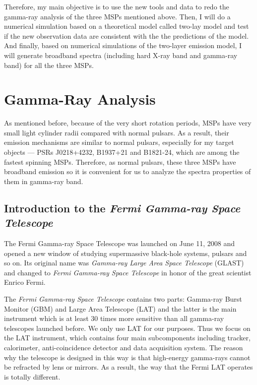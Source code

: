 \documentclass[12pt]{report}
\begin{document}
            Therefore, my main objective is to use the new tools and data to redo the gamma-ray
            analysis of the three MSPs mentioned above. 
            Then, I will do a numerical simulation based on a theoretical model called two-lay model and test if the new observation 
            data are consistent with the the predictions of the model. And finally, based on numerical simulations 
            of the two-layer emission model, I will generate broadband spectra (including hard X-ray band 
            and gamma-ray band) for all the three MSPs. 

  \chapter{Gamma-Ray Analysis}
      As mentioned before, because of the very short rotation periods, MSPs have very small light cylinder radii 
      compared with normal pulsars. As a result, their emission mechanisms are similar to normal pulsars, 
      especially for my target objects --- PSRs J0218+4232, B1937+21 and B1821-24, 
      which are among the fastest spinning MSPs. Therefore, as normal pulsars, these three 
      MSPs have broadband emission so it is convenient for us to analyze the spectra 
      properties of them in gamma-ray band.
  
      \section{Introduction to the \textit{Fermi Gamma-ray Space Telescope}}
        The Fermi Gamma-ray Space Telescope was launched on June 11, 2008 and opened a new window of studying
        supermassive black-hole systems, pulsars and so on. Its original name was \textit{Gamma-ray Large Area Space 
        Telescope} (GLAST) and changed to \textit{Fermi Gamma-ray Space Telescope} 
        in honor of the great scientist Enrico Fermi. 

        The \textit{Fermi Gamma-ray Space Telescope} contains two parts: Gamma-ray Burst Monitor (GBM) and Large 
        Area Telescope (LAT) and the latter is the main instrument which is at least 30 times more sensitive than 
        all gamma-ray telescopes launched before. We only use LAT for our purposes. Thus we 
        focus on the LAT instrument, which contains four main subcomponents including tracker, calorimeter,
        anti-coincidence detector and data acquisition system. The reason why the telescope is designed in 
        this way is that high-energy gamma-rays cannot be refracted by lens or mirrors. As a result, the way
        that the Fermi LAT operates is totally different. 
\end{document}
